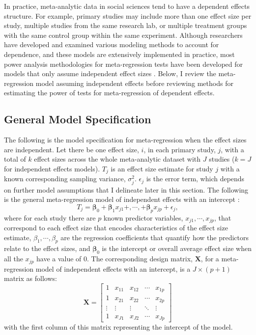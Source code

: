 In practice, meta-analytic data in social sciences tend to have a dependent effects structure. For example, primary studies may include more than one effect size per study, multiple studies from the same research lab, or multiple treatment groups with the same control group within the same experiment. Although researchers have developed and examined various modeling methods to account for dependence, and these models are extensively implemented in practice, most power analysis methodologies for meta-regression tests have been developed for models that only assume independent effect sizes \autocite{hedges2001, hedges2004, jackson2017}.  Below, I review the meta-regression model assuming independent effects before reviewing methods for estimating the power of tests for meta-regression of dependent effects.  

              
\subsection{General Model Specification}
The following is the model specification for meta-regression when the effect sizes are independent. Let there be one effect size, $i$, in each primary study, $j$, with a total of $k$ effect sizes across the whole meta-analytic dataset with $J$ studies ($k = J$ for independent effects models). $T_j$ is an effect size estimate for study $j$ with a known corresponding sampling variance, $\sigma_j^2$. 
$\epsilon_j$ is the error term, which depends on further model assumptions that I delineate later in this section.
The following is the general meta-regression model of independent effects with an intercept \autocite{cooper2019}:
\begin{equation} \label{eq:meta-regression independent}
T_j =  \mathbf{\beta}_0 + \mathbf{\beta}_1x_{j1} +, \cdots,+ \mathbf{\beta}_px_{jp} + \epsilon_j,
\end{equation}
where for each study there are $p$ known predictor variables, $x_{j1}, \cdots, x_{jp}$, that correspond to each effect size that encodes characteristics of the effect size estimate, $\beta_1, \cdots, \beta_p$ are the regression coefficients that quantify how the predictors relate to the effect sizes, and $\mathbf{\beta}_0$ is the intercept or overall average effect size when all the $x_{jp}$ have a value of $0$. The corresponding design matrix, $\mathbf{X}$, for a meta-regression model of independent effects with an intercept, is a $J \times (p+1)$ matrix as follows:
\begin{equation}
    \mathbf{X} = \begin{bmatrix}
    1 & x_{11} & x_{12}  &\cdots & x_{1p} \\
    1 & x_{21} & x_{22} & \cdots & x_{2p}\\
    \vdots & \vdots & \vdots & \ddots & \vdots\\
    1 & x_{J1} & x_{J2} & \cdots & x_{Jp}
    \end{bmatrix}
    \nonumber
\end{equation}
with the first column of this matrix representing the intercept of the model. 

